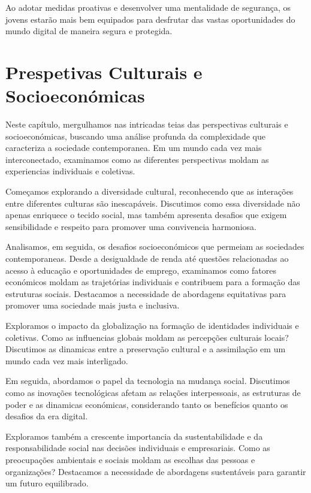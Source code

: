 \documentclass{report}
\begin{document}
Ao adotar medidas proativas e desenvolver uma mentalidade de segurança, os jovens estarão mais bem equipados para desfrutar das vastas oportunidades do mundo digital de maneira segura e protegida.


\chapter{Prespetivas Culturais e Socioeconómicas}
\label{chap.Prespetivas Culturais}

Neste capítulo, mergulhamos nas intricadas teias das perspectivas culturais e socioeconómicas, buscando uma análise profunda da complexidade que caracteriza a sociedade contemporanea. Em um mundo cada vez mais interconectado, examinamos como as diferentes perspectivas moldam as experiencias individuais e coletivas.

Começamos explorando a diversidade cultural, reconhecendo que as interações entre diferentes culturas são inescapáveis. Discutimos como essa diversidade não apenas enriquece o tecido social, mas também apresenta desafios que exigem sensibilidade e respeito para promover uma convivencia harmoniosa.

Analisamos, em seguida, os desafios socioeconómicos que permeiam as sociedades contemporaneas. Desde a desigualdade de renda até questões relacionadas ao acesso à educação e oportunidades de emprego, examinamos como fatores económicos moldam as trajetórias individuais e contribuem para a formação das estruturas sociais. Destacamos a necessidade de abordagens equitativas para promover uma sociedade mais justa e inclusiva.

Exploramos o impacto da globalização na formação de identidades individuais e coletivas. Como as influencias globais moldam as percepções culturais locais? Discutimos as dinamicas entre a preservação cultural e a assimilação em um mundo cada vez mais interligado.

Em seguida, abordamos o papel da tecnologia na mudança social. Discutimos como as inovações tecnológicas afetam as relações interpessoais, as estruturas de poder e as dinamicas económicas, considerando tanto os benefícios quanto os desafios da era digital.

Exploramos também a crescente importancia da sustentabilidade e da responsabilidade social nas decisões individuais e empresariais. Como as preocupações ambientais e sociais moldam as escolhas das pessoas e organizações? Destacamos a necessidade de abordagens sustentáveis para garantir um futuro equilibrado.
\end{document}

